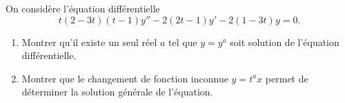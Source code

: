 

\begin{exercice}\label{exo_II-1-20}

On considère l'équation différentielle 
\begin{equation}
	t(2-3t)(t-1)y''-2(2t-1)y'-2(1-3t)y=0.
\end{equation}
\begin{enumerate}
\item 
Montrer qu'il existe un seul réel $a$ tel que $y=y^a$ soit solution de l'équation différentielle.

\item
Montrer que le changement de fonction inconnue $y=t^ax$ permet de déterminer la solution générale de l'équation.

\end{enumerate}

\end{exercice}
